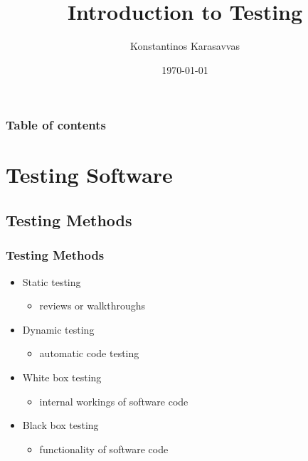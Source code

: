 \documentclass{beamer}
\begin{document}
\title{Introduction to Testing}
\author[Konstantinos Karasavvas]{Konstantinos Karasavvas} %

\date{\today} 

\begin{frame}
  \titlepage
\end{frame}

\begin{frame}
\setcounter{tocdepth}{1}
\frametitle{Table of contents}
\tableofcontents
\end{frame} 





\section{Testing Software} 
\subsection{Testing Methods}
\begin{frame}[fragile]\frametitle{Testing Methods} 
  \begin{itemize}
    \item Static testing
    \begin{itemize}
      \item reviews or walkthroughs
    \end{itemize}

    \item Dynamic testing
    \begin{itemize}
      \item automatic code testing
    \end{itemize}
    
    \item White box testing
    \begin{itemize}
      \item internal workings of software code
    \end{itemize}
        
    \item Black box testing
    \begin{itemize}
      \item functionality of software code
    \end{itemize}
  \end{itemize}
\end{frame}
\end{document}
